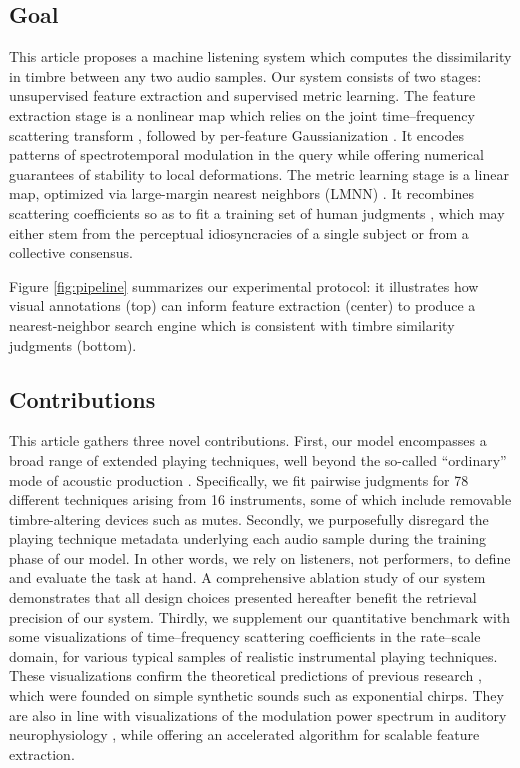 \documentclass{bmcart}
\begin{document}
\subsection*{Goal}
This article proposes a machine listening system which computes the dissimilarity in timbre between any two audio samples.
Our system consists of two stages: unsupervised feature extraction and supervised metric learning.
The feature extraction stage is a nonlinear map which relies on the joint time--frequency scattering transform \cite{anden2015mlsp,anden2019tsp}, followed by per-feature Gaussianization \cite{lostanlen2018jasmp}.
It encodes patterns of spectrotemporal modulation in the query while offering numerical guarantees of stability to local deformations.
The metric learning stage is a linear map, optimized via large-margin nearest neighbors (LMNN) \cite{weinberger2009distance}.
It recombines scattering coefficients so as to fit a training set of human judgments \cite{mcadams1995psychres}, which may either stem from the perceptual idiosyncracies of a single subject or from a collective consensus.

Figure \ref{fig:pipeline} summarizes our experimental protocol: it illustrates how visual annotations (top) can inform feature extraction (center) to produce a nearest-neighbor search engine which is consistent with timbre similarity judgments (bottom).


\subsection*{Contributions}
This article gathers three novel contributions.
First, our model encompasses a broad range of extended playing techniques, well beyond the so-called ``ordinary'' mode of acoustic production \cite{lostanlen2018extended}.
Specifically, we fit pairwise judgments for 78 different techniques arising from 16 instruments, some of which include removable timbre-altering devices such as mutes.
Secondly, we purposefully disregard the playing technique metadata underlying each audio sample during the training phase of our model.
In other words, we rely on listeners, not performers, to define and evaluate the task at hand.
A comprehensive ablation study of our system demonstrates that all design choices presented hereafter benefit the retrieval precision of our system.
Thirdly, we supplement our quantitative benchmark with some visualizations of time--frequency scattering coefficients in the rate--scale domain, for various typical samples of realistic instrumental playing techniques.
These visualizations confirm the theoretical predictions of previous research \cite{anden2019tsp}, which were founded on simple synthetic sounds such as exponential chirps.
They are also in line with visualizations of the modulation power spectrum in auditory neurophysiology \cite{patil2012ploscompbiol}, while offering an accelerated algorithm for scalable feature extraction.
\end{document}

